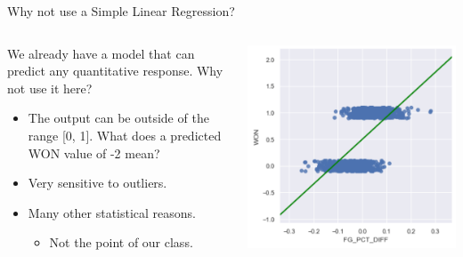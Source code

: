 \documentclass[aspectratio=169]{../latex_main/tntbeamer}  %
\begin{document}
	
	\begin{frame}{Why not use a Simple Linear Regression?}
	    \begin{columns}
	        \begin{column}{.4\textwidth}
	                We already have a model that can predict any quantitative response. Why not use it here?
	                \begin{itemize}
	                    \item The output can be outside of the range [0, 1]. What does a predicted WON value of -2 mean?
	                    \item Very sensitive to outliers.
	                    \item Many other statistical reasons.
	                    \begin{itemize}
	                        \item Not the point of our class.
	                    \end{itemize}
	                \end{itemize}
	        \end{column}
	        
	        \begin{column}{.4\textwidth}

	                    \includegraphics[scale=.5]{Bild4}
	        \end{column}
	    \end{columns}
	\end{frame}
	
\end{document}
